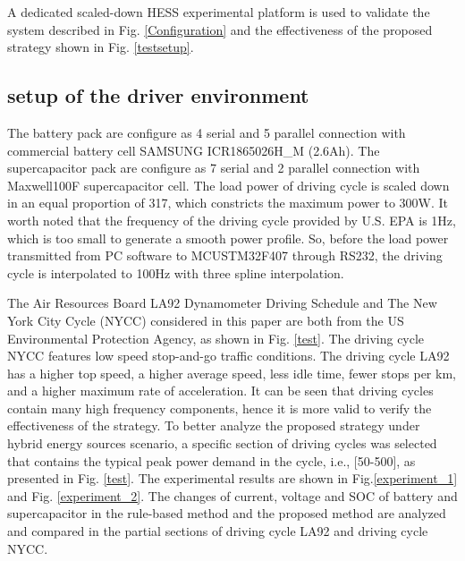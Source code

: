 \documentclass[energies,article,submit,moreauthors,pdftex,10pt,a4paper]{Definitions/mdpi}
\begin{document}
%
A dedicated scaled-down HESS experimental platform is used to validate the system described in Fig. \ref{Configuration} and the effectiveness of the proposed strategy shown in Fig. \ref{testsetup}. 
 
\subsection{setup of the driver environment}
The battery pack are configure as 4 serial and 5 parallel connection with commercial battery cell SAMSUNG ICR18650\-26H\_M (2.6Ah). The supercapacitor pack are configure as 7 serial and 2 parallel connection with Maxwell\-100F supercapacitor cell. The load power of driving cycle is scaled down in an equal proportion
of 317, which constricts the maximum power to 300W. It worth noted that the frequency of the driving cycle provided by U.S. EPA is 1Hz, which is too small to generate a smooth
power profile. So, before the load power transmitted from PC software to MCU\-STM32F407 through RS232, the driving cycle is interpolated to 100Hz with three spline interpolation.


The Air Resources Board LA92 Dynamometer Driving Schedule and The New York City Cycle (NYCC) considered in this paper are both from the US Environmental Protection Agency, as shown in Fig. \ref{test}. The driving cycle NYCC features low speed stop-and-go traffic conditions. The driving cycle LA92 has a higher top speed, a higher average speed, less idle time, fewer stops per km, and a higher maximum rate of acceleration. It can be seen that driving cycles contain many high frequency components, hence it is more valid to verify the effectiveness of the strategy.
To better analyze the proposed strategy under hybrid energy sources scenario, a specific section of driving cycles was selected that contains the typical peak power demand in the cycle, i.e., [50-500], as presented in Fig. \ref{test}. The experimental results are shown in Fig.\ref{experiment_1} and Fig. \ref{experiment_2}. The changes of current, voltage and SOC of battery and supercapacitor in the rule-based method and the proposed method are analyzed and compared in the partial sections of driving cycle LA92 and driving cycle NYCC.
\end{document}
